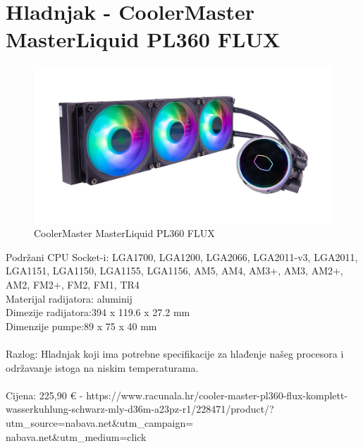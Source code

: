 \documentclass{report}
\begin{document}
\pagebreak

\section{Hladnjak - CoolerMaster MasterLiquid PL360 FLUX}
\begin{figure}[H]
    \centering
    \includegraphics[scale=0.22]{Slike/hladnjak.jpg}
    \caption{CoolerMaster MasterLiquid PL360 FLUX}
    \label{fig:hladnjak}
\end{figure}
Podržani CPU Socket-i: LGA1700, LGA1200, LGA2066, LGA2011-v3, LGA2011, LGA1151, LGA1150, LGA1155, LGA1156, AM5, AM4, AM3+, AM3, AM2+, AM2, FM2+, FM2, FM1, TR4\\Materijal radijatora: aluminij\\Dimezije radijatora:394 x 119.6 x 27.2 mm \\Dimenzije pumpe:89 x 75 x 40 mm\\\\Razlog: Hladnjak koji ima potrebne specifikacije za hlađenje našeg procesora i održavanje istoga na niskim temperaturama.\\\\Cijena: 225,90 € - https://www.racunala.hr/cooler-master-pl360-flux-komplett-wasserkuhlung-schwarz-mly-d36m-a23pz-r1/228471/product/?utm\_source=nabava.net\&utm\_campaign=\\nabava.net\&utm\_medium=click
\end{document}

